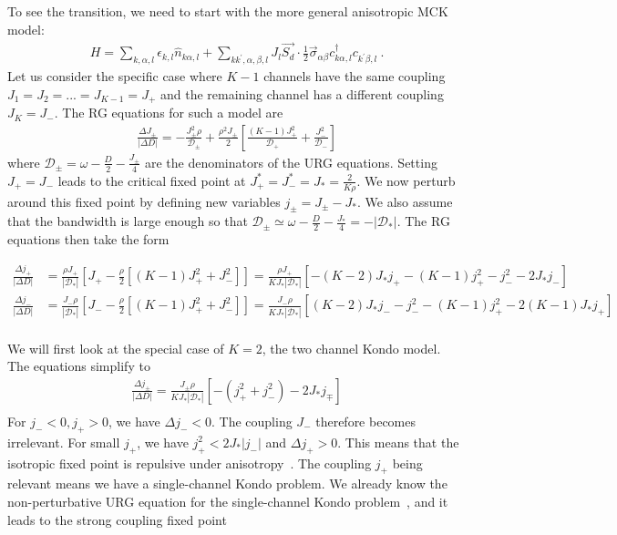 \documentclass[reprint,prb,superscriptaddress]{revtex4-2}
\begin{document}
To see the transition, we need to start with the more general anisotropic MCK model:
\begin{align}
	H = \sum_{k,\alpha,l}\epsilon_{k,l} \hat n_{k\alpha,l} + \sum_{kk^\prime,\alpha,\beta,l}J_l \vec{S_d}\cdot\frac{1}{2}\vec{\sigma}_{\alpha\beta}c_{k\alpha,l}^\dagger c_{k^\prime\beta, l}~.
\end{align}
Let us consider the specific case where \(K-1\) channels have the same coupling \(J_1 = J_2 = ... = J_{K-1} = J_+\) and the remaining channel has a different coupling \(J_K = J_-\). The RG equations for such a model are
\begin{align}
	\frac{\Delta J_\pm}{|\Delta D|} = -\frac{J_\pm^2 \rho}{\mathcal{D}_\pm} + \frac{\rho^2 J_\pm}{2}\left[\frac{(K-1)J_+^2}{\mathcal{D}_+} + \frac{J_-^2}{\mathcal{D}_-}\right]
\end{align}
where \(\mathcal{D}_\pm = \omega - \frac{D}{2} - \frac{J_\pm}{4}\) are the denominators of the URG equations.
Setting \(J_+ = J_-\) leads to the critical fixed point at \(J_+^* = J_-^* = J_* = \frac{2}{K \rho}\). We now perturb around this fixed point by defining new variables \(j_\pm = J_\pm - J_*\). We also assume that the bandwidth is large enough so that \(\mathcal{D}_\pm \simeq \omega - \frac{D}{2} - \frac{J_*}{4} = -|\mathcal{D}_*|\). The RG equations then take the form
\begin{widetext}
\begin{align}
	\frac{\Delta j_+}{|\Delta D|} &= \frac{\rho J_+}{ |\mathcal{D}_*|}\left[J_+ - \frac{\rho}{2}\left[(K-1)J_+^2 + J_-^2\right]\right] = \frac{\rho J_+}{K J_*|\mathcal{D}_*|}\left[-\left(K - 2\right)J_*j_+ - (K-1)j_+^2 - j_-^2 - 2J_* j_-\right]\\
	\frac{\Delta j_-}{|\Delta D|} &= \frac{J_- \rho}{|\mathcal{D}_*|}\left[J_- - \frac{\rho}{2}\left[(K-1)J_+^2 + J_-^2\right]\right] = \frac{J_- \rho}{K J_*|\mathcal{D}_*|}\left[\left(K - 2\right)J_*j_-  - j_-^2 - (K-1)j_+^2 - 2(K-1)J_* j_+\right]\\
\end{align}
\end{widetext}
We will first look at the special case of \(K=2\), the two channel Kondo model. The equations simplify to
\begin{align}
	\frac{\Delta j_\pm}{|\Delta D|} = \frac{J_\pm \rho}{K J_*|\mathcal{D}_*|}\left[- \left(j_+^2 + j_-^2\right) - 2J_* j_\mp\right]\\
\end{align}
For \(j_- < 0, j_+ > 0\), we have \(\Delta j_- < 0\). The coupling \(J_-\) therefore becomes irrelevant. For small \(j_+\), we have \(j_+^2 < 2J_* |j_-|\)  and \(\Delta j_+ > 0\). This means that the isotropic fixed point is repulsive under anisotropy~\cite{Noz_blandin_1980}. The coupling \(j_+\) being relevant means we have a single-channel Kondo problem. We already know the non-perturbative URG equation for the single-channel Kondo problem~\cite{kondo_urg}, and it leads to the strong coupling fixed point
\end{document}
